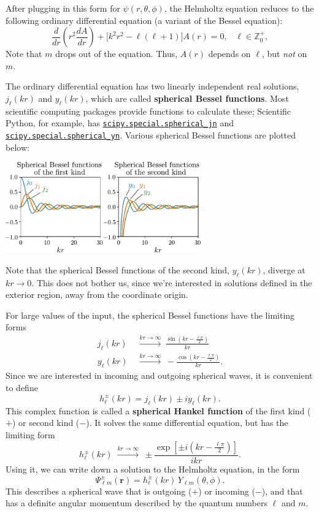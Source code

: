 \documentclass[pra,12pt]{revtex4}
\begin{document}
After plugging in this form for $\psi(r,\theta,\phi)$, the Helmholtz
equation reduces to the following ordinary differential equation (a
variant of the Bessel equation):
$$\frac{d}{dr}\left(r^2\frac{dA}{dr}\right) + \Big[k^2r^2 - \ell(\ell+1)\Big] A(r) = 0, \;\;\;\ell \in \mathbb{Z}_0^+,$$
Note that $m$ drops out of the equation.  Thus, $A(r)$ depends on
$\ell$, but \textit{not} on $m$.

The ordinary differential equation has two linearly independent real
solutions, $j_\ell(kr)$ and $y_\ell(kr)$, which are called
\textbf{spherical Bessel functions}.  Most scientific computing
packages provide functions to calculate these; Scientific Python, for
example, has
\href{https://docs.scipy.org/doc/scipy/reference/generated/scipy.special.spherical_jn.html}{\texttt{scipy.special.spherical\_jn}}
and
\href{https://docs.scipy.org/doc/scipy/reference/generated/scipy.special.spherical_yn.html}{\texttt{scipy.special.spherical\_yn}}.
Various spherical Bessel functions are plotted below:

\vskip 0.5cm
\begin{center}
  \includegraphics[width=0.63\textwidth]{spherical_bessel}
\end{center}

Note that the spherical Bessel functions of the second kind,
$y_\ell(kr)$, diverge at $kr\rightarrow 0$.  This does not bother us,
since we're interested in solutions defined in the exterior region,
away from the coordinate origin.

For large values of the input, the spherical Bessel functions have the
limiting forms
$$\begin{aligned}j_\ell(kr)\; &\overset{kr\rightarrow\infty}{\longrightarrow} \; \frac{\sin(kr-\frac{\ell\pi}{2})}{kr} \\ y_\ell(kr)\; &\overset{kr\rightarrow\infty}{\longrightarrow} \; - \frac{\cos(kr-\frac{\ell\pi}{2})}{kr}.\end{aligned}$$
Since we are interested in incoming and outgoing spherical waves, it
is convenient to define
$$h_\ell^\pm(kr) = j_\ell(kr) \pm i y_\ell(kr).$$
This complex function is called a \textbf{spherical Hankel function}
of the first kind ($+$) or second kind ($-$).  It solves the same
differential equation, but has the limiting form
$$h_\ell^\pm(kr)\; \overset{kr\rightarrow\infty}{\longrightarrow} \; \pm \frac{\exp\left[\pm i(kr-\frac{\ell\pi}{2})\right]}{ikr}.$$
Using it, we can write down a solution to the Helmholtz equation, in
the form
$$\Psi_{\ell m}^\pm(\mathbf{r}) = h_{\ell}^\pm(kr) \,Y_{\ell m}(\theta,\phi).$$
This describes a spherical wave that is outgoing ($+$) or incoming
($-$), and that has a definite angular momentum described by the
quantum numbers $\ell$ and $m$.
\end{document}
